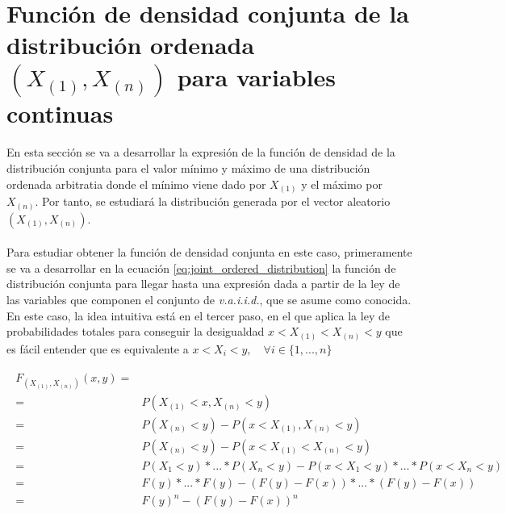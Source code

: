 \documentclass{article}
\begin{document}
  \section{Función de densidad conjunta de la distribución ordenada $(X_{(1)}, X_{(n)})$ para variables continuas}
  \label{sec:e2}

    \paragraph{}
    En esta sección se va a desarrollar la expresión de la función de densidad de la distribución conjunta para el valor mínimo y máximo de una distribución ordenada arbitratia donde el mínimo viene dado por $X_{(1)}$ y el máximo por $X_{(n)}$. Por tanto, se estudiará la distribución generada por el vector aleatorio $(X_{(1)}, X_{(n)})$.

    \paragraph{}
    Para estudiar obtener la función de densidad conjunta en este caso, primeramente se va a desarrollar en la ecuación \ref{eq:joint_ordered_distribution} la función de distribución conjunta para llegar hasta una expresión dada a partir de la ley de las variables que componen el conjunto de \emph{v.a.i.i.d.}, que se asume como conocida. En este caso, la idea intuitiva está en el tercer paso, en el que aplica la ley de probabilidades totales para conseguir la desigualdad $x < X_{(1)} < X_{(n)} < y$ que es fácil entender que es equivalente a $x < X_i < y,\quad \forall i \in \{1, ..., n\}$

    \begin{align}
    \label{eq:joint_ordered_distribution}
      \begin{split}
        F_{(X_{(1)}, X_{(n)})} (x,y) =& \\
        =& P(X_{(1)} < x, X_{(n)} < y) \\
        =& P(X_{(n)} < y) - P(x < X_{(1)}, X_{(n)} < y) \\
        =& P(X_{(n)} < y) - P(x < X_{(1)} < X_{(n)} < y) \\
        =& P(X_{1} < y) * ... * P(X_{n} < y) - P(x < X_1 < y) * ... * P(x < X_n < y) \\
        =& F(y) * ... *F(y)  - (F(y)-F(x)) * ... * (F(y)-F(x)) \\
        =& F(y)^n - (F(y)-F(x))^n
      \end{split}
    \end{align}
\end{document}
